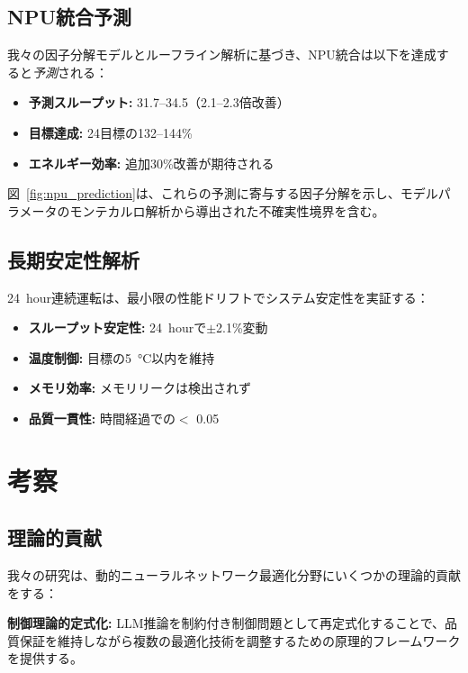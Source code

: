 \documentclass[10pt,twocolumn,a4paper]{jarticle}
\newcommand{\tps}{\text{tok/s}}
\newcommand{\ppl}{\mathrm{PPL}}
\begin{document}
\subsection{NPU統合予測}

我々の因子分解モデルとルーフライン解析に基づき、NPU統合は以下を達成すると\emph{予測}される：

\begin{itemize}
\item \textbf{予測スループット:} 31.7--\SI{34.5}{\tps}（2.1--2.3倍改善）
\item \textbf{目標達成:} \SI{24}{\tps}目標の132--144\%
\item \textbf{エネルギー効率:} 追加30\%改善が期待される
\end{itemize}

図~\ref{fig:npu_prediction}は、これらの予測に寄与する因子分解を示し、モデルパラメータのモンテカルロ解析から導出された不確実性境界を含む。

\subsection{長期安定性解析}

\SI{24}{hour}連続運転は、最小限の性能ドリフトでシステム安定性を実証する：

\begin{itemize}
\item \textbf{スループット安定性:} \SI{24}{hour}で$\pm$2.1\%変動
\item \textbf{温度制御:} 目標の\SI{5}{\celsius}以内を維持
\item \textbf{メモリ効率:} メモリリークは検出されず
\item \textbf{品質一貫性:} 時間経過での$<$ 0.05
\end{itemize}

\section{考察}

\subsection{理論的貢献}

我々の研究は、動的ニューラルネットワーク最適化分野にいくつかの理論的貢献をする：

\textbf{制御理論的定式化:} LLM推論を制約付き制御問題として再定式化することで、品質保証を維持しながら複数の最適化技術を調整するための原理的フレームワークを提供する。
\end{document}
